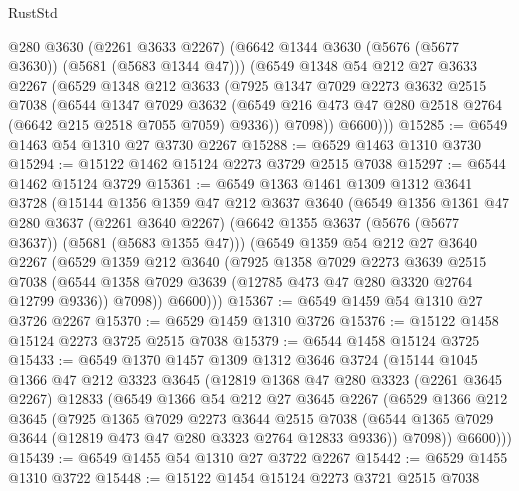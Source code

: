 \begin{lexlean}{RustStd}
\begin{coremodule}
        @280
        @3630
        (@2261 @3633 @2267)
        (@6642 @1344 @3630 (@5676 (@5677 @3630)) (@5681 (@5683 @1344 @47)))
        (@6549
          @1348
          @54
          @212
          @27
          @3633
          @2267
          (@6529
            @1348
            @212
            @3633
            (@7925
              @1347
              @7029
              @2273
              @3632
              @2515
              @7038
              (@6544
                @1347
                @7029
                @3632
                (@6549 @216 @473 @47 @280 @2518 @2764 (@6642 @215 @2518 @7055 @7059) @9336))
              @7098))
          @6600)))
@15285 := @6549 @1463 @54 @1310 @27 @3730 @2267
@15288 := @6529 @1463 @1310 @3730
@15294 := @15122 @1462 @15124 @2273 @3729 @2515 @7038
@15297 := @6544 @1462 @15124 @3729
@15361 := @6549
    @1363
    @1461
    @1309
    @1312
    @3641
    @3728
    (@15144
      @1356
      @1359
      @47
      @212
      @3637
      @3640
      (@6549
        @1356
        @1361
        @47
        @280
        @3637
        (@2261 @3640 @2267)
        (@6642 @1355 @3637 (@5676 (@5677 @3637)) (@5681 (@5683 @1355 @47)))
        (@6549
          @1359
          @54
          @212
          @27
          @3640
          @2267
          (@6529
            @1359
            @212
            @3640
            (@7925
              @1358
              @7029
              @2273
              @3639
              @2515
              @7038
              (@6544 @1358 @7029 @3639 (@12785 @473 @47 @280 @3320 @2764 @12799 @9336))
              @7098))
          @6600)))
@15367 := @6549 @1459 @54 @1310 @27 @3726 @2267
@15370 := @6529 @1459 @1310 @3726
@15376 := @15122 @1458 @15124 @2273 @3725 @2515 @7038
@15379 := @6544 @1458 @15124 @3725
@15433 := @6549
    @1370
    @1457
    @1309
    @1312
    @3646
    @3724
    (@15144
      @1045
      @1366
      @47
      @212
      @3323
      @3645
      (@12819
        @1368
        @47
        @280
        @3323
        (@2261 @3645 @2267)
        @12833
        (@6549
          @1366
          @54
          @212
          @27
          @3645
          @2267
          (@6529
            @1366
            @212
            @3645
            (@7925
              @1365
              @7029
              @2273
              @3644
              @2515
              @7038
              (@6544 @1365 @7029 @3644 (@12819 @473 @47 @280 @3323 @2764 @12833 @9336))
              @7098))
          @6600)))
@15439 := @6549 @1455 @54 @1310 @27 @3722 @2267
@15442 := @6529 @1455 @1310 @3722
@15448 := @15122 @1454 @15124 @2273 @3721 @2515 @7038

\end{coremodule}
\end{lexlean}
